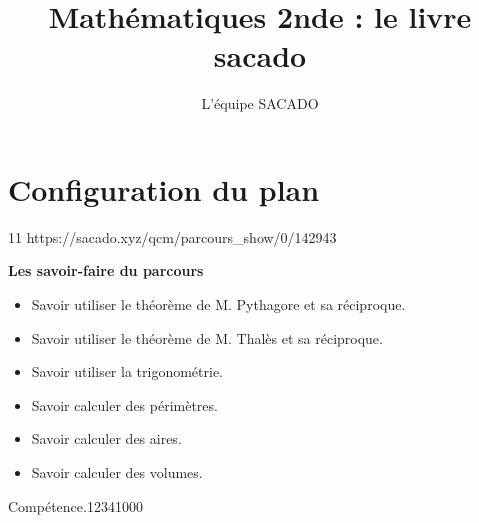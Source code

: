 



\title{Mathématiques 2nde  : le livre sacado}
\author{L'équipe SACADO}




\chapter{Configuration du plan}{11}
{https://sacado.xyz/qcm/parcours_show/0/142943}
{
 \begin{CpsCol}
	\textbf{Les savoir-faire du parcours}
 	\begin{itemize}
 		\item Savoir utiliser le théorème de M. Pythagore et sa réciproque.
		\item Savoir utiliser le théorème de M. Thalès et sa réciproque.
		\item Savoir utiliser la trigonométrie.
		\item Savoir calculer des périmètres.
		\item Savoir calculer des aires.
		\item Savoir calculer des volumes.
 	\end{itemize}
 \end{CpsCol}

\begin{His}
\end{His}

\begin{ExoDec}{Compétence.}{1234}{1}{0}{0}{0}
\end{ExoDec}
}


